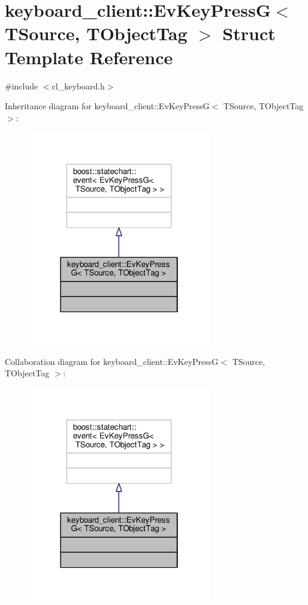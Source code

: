 \hypertarget{structkeyboard__client_1_1EvKeyPressG}{}\section{keyboard\+\_\+client\+:\+:Ev\+Key\+PressG$<$ T\+Source, T\+Object\+Tag $>$ Struct Template Reference}
\label{structkeyboard__client_1_1EvKeyPressG}


{\ttfamily \#include $<$cl\+\_\+keyboard.\+h$>$}



Inheritance diagram for keyboard\+\_\+client\+:\+:Ev\+Key\+PressG$<$ T\+Source, T\+Object\+Tag $>$\+:\nopagebreak
\begin{figure}[H]
\begin{center}
\leavevmode
\includegraphics[width=226pt]{structkeyboard__client_1_1EvKeyPressG__inherit__graph}
\end{center}
\end{figure}


Collaboration diagram for keyboard\+\_\+client\+:\+:Ev\+Key\+PressG$<$ T\+Source, T\+Object\+Tag $>$\+:\nopagebreak
\begin{figure}[H]
\begin{center}
\leavevmode
\includegraphics[width=226pt]{structkeyboard__client_1_1EvKeyPressG__coll__graph}
\end{center}
\end{figure}


